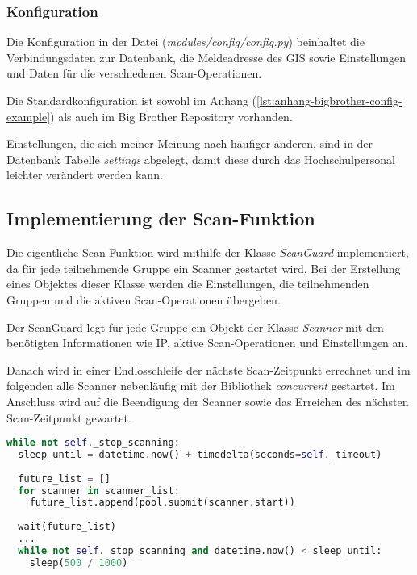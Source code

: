 \subsubsection{Konfiguration}

Die Konfiguration in der Datei (\textit{modules/config/config.py}) beinhaltet die Verbindungsdaten zur Datenbank, die Meldeadresse des GIS sowie Einstellungen und Daten für die verschiedenen Scan-Operationen.

Die Standardkonfiguration ist sowohl im Anhang (\ref{lst:anhang-bigbrother-config-example}) als auch im Big Brother Repository vorhanden.

Einstellungen, die sich meiner Meinung nach häufiger änderen, sind in der Datenbank Tabelle \textit{settings} abgelegt, damit diese durch das Hochschulpersonal leichter verändert werden kann.

\subsection{Implementierung der Scan-Funktion}

Die eigentliche Scan-Funktion wird mithilfe der Klasse \textit{ScanGuard} implementiert, da für jede teilnehmende Gruppe ein Scanner gestartet wird. Bei der Erstellung eines Objektes dieser Klasse werden die Einstellungen, die teilnehmenden Gruppen und die aktiven Scan-Operationen übergeben.

Der ScanGuard legt für jede Gruppe ein Objekt der Klasse \textit{Scanner} mit den benötigten Informationen wie IP, aktive Scan-Operationen und Einstellungen an.

Danach wird in einer Endlosschleife der nächste Scan-Zeitpunkt errechnet und im folgenden alle Scanner nebenläufig mit der Bibliothek \textit{concurrent} gestartet. Im Anschluss wird auf die Beendigung der Scanner sowie das Erreichen des nächsten Scan-Zeitpunkt gewartet.

\begin{lstlisting}[language=Python, frame=single, caption={Big Brother ScanGaurd}, captionpos=b, label={lst:bigbrother-scanguard}]
while not self._stop_scanning:
  sleep_until = datetime.now() + timedelta(seconds=self._timeout)
  
  future_list = []
  for scanner in scanner_list:
    future_list.append(pool.submit(scanner.start))
    
  wait(future_list)
  ...
  while not self._stop_scanning and datetime.now() < sleep_until:
    sleep(500 / 1000)
\end{lstlisting}

